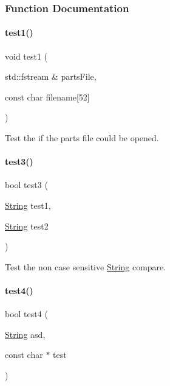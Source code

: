 \subsubsection{Function Documentation}
\mbox{\label{atest_8cpp_acdf8ec90b79eca8d516b03baa19a1b44}} 
\paragraph{\texorpdfstring{test1()}{test1()}}
{\footnotesize\ttfamily void test1 (\begin{DoxyParamCaption}\item[{std\+::fstream \&}]{parts\+File,  }\item[{const char}]{filename\mbox{[}52\mbox{]} }\end{DoxyParamCaption})}



Test the if the parts file could be opened. 

\mbox{\label{atest_8cpp_a6e6df2af48d16780853d6eddcb8c8bc4}} 
\paragraph{\texorpdfstring{test3()}{test3()}}
{\footnotesize\ttfamily bool test3 (\begin{DoxyParamCaption}\item[{\mbox{\hyperlink{class_string}{String}}}]{test1,  }\item[{\mbox{\hyperlink{class_string}{String}}}]{test2 }\end{DoxyParamCaption})}



Test the non case sensitive \mbox{\hyperlink{class_string}{String}} compare. 

\mbox{\label{atest_8cpp_ab545ece7a108a6470a3dc2161ba0008b}} 
\paragraph{\texorpdfstring{test4()}{test4()}}
{\footnotesize\ttfamily bool test4 (\begin{DoxyParamCaption}\item[{\mbox{\hyperlink{class_string}{String}}}]{asd,  }\item[{const char $\ast$}]{test }\end{DoxyParamCaption})}



